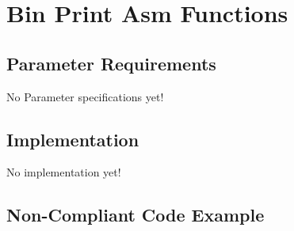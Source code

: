 %
%

\section{Bin Print Asm Functions}
\label{BinPrintAsmFunctions::overview}


\subsection{Parameter Requirements}

   No Parameter specifications yet!

\subsection{Implementation}

   No implementation yet!

\subsection{Non-Compliant Code Example}


